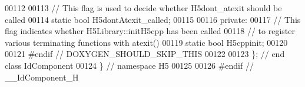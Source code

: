 \begin{DoxyCode}
00112 
00113         \textcolor{comment}{// This flag is used to decide whether H5dont\_atexit should be called}
00114         \textcolor{keyword}{static} \textcolor{keywordtype}{bool} H5dontAtexit\_called;
00115 
00116     \textcolor{keyword}{private}:
00117         \textcolor{comment}{// This flag indicates whether H5Library::initH5cpp has been called}
00118         \textcolor{comment}{// to register various terminating functions with atexit()}
00119         \textcolor{keyword}{static} \textcolor{keywordtype}{bool} H5cppinit;
00120 
00121 \textcolor{preprocessor}{#endif // DOXYGEN\_SHOULD\_SKIP\_THIS}
00122 
00123 \}; \textcolor{comment}{// end class IdComponent}
00124 \} \textcolor{comment}{// namespace H5}
00125 
00126 \textcolor{preprocessor}{#endif // \_\_IdComponent\_H}
\end{DoxyCode}
